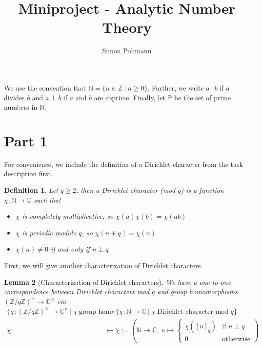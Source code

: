 \documentclass{scrartcl}
\title{Miniproject - Analytic Number Theory}
\author{Simon Pohmann}
\date{}
\newcommand{\primes}{\mathbb{P}}
\newcommand{\N}{\mathbb{N}}
\newcommand{\Z}{\mathbb{Z}}
\newcommand{\C}{\mathbb{C}}
\newcommand{\divides}{\ | \ }
\newcommand{\units}{\times}
\newtheorem{definition}{Definition}
\newtheorem{lemma}[definition]{Lemma}
\begin{document}
\maketitle
We use the convention that $\N = \{ n \in \Z \ | \ n \geq 0 \}$.
Further, we write $a \divides b$ if $a$ divides $b$ and $a \perp b$ if $a$ and $b$ are coprime.
Finally, let $\primes$ be the set of prime numbers in $\N$.

\section{Part 1}

For convenience, we include the definition of a Dirichlet character from the task description first.
\begin{definition}
    Let $q \geq 2$, then a \emph{Dirichlet character (mod $q$)} is a function $\chi: \N \to \C$ such that
    \begin{itemize}
        \item $\chi$ is completely multiplicative, so $\chi(a)\chi(b) = \chi(ab)$
        \item $\chi$ is periodic modulo $q$, so $\chi(n + q) = \chi(n)$
        \item $\chi(n) \neq 0$ if and only if $n \perp q$
    \end{itemize}
\end{definition}
First, we will give another characterization of Dirichlet characters.
\begin{lemma}[Characterization of Dirichlet characters]
    \label{prop:characterization_dirichlet_character}
    We have a one-to-one correspondence between Dirichlet characters mod $q$ and group homomorphisms $(\Z/q\Z)^\units \to \C^\units$ via
    \begin{align*}
        \{ \chi: (\Z/q\Z)^\units \to \C^\units \ | \ \chi \ \text{group hom} \} &\to \{ \chi: \N \to \C \ | \ \chi \ \text{Dirichlet character mod $q$} \} \\
        \chi &\mapsto \tilde{\chi} := \left( \N \to \C, \ n \mapsto \begin{cases}
            \chi([n]_q) & \text{if $n \perp q$} \\
            0 & \text{otherwise}
        \end{cases} \right)
    \end{align*}
\end{lemma}
\end{document}
